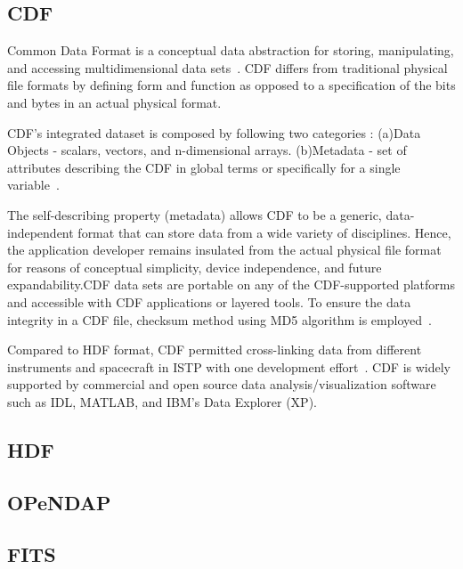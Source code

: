 {\subsection{CDF }

Common Data Format is a conceptual data abstraction for storing,
manipulating, and accessing multidimensional data
sets~\cite{www-cdf}. CDF differs from traditional physical file
formats by defining form and function as opposed to a specification of
the bits and bytes in an actual physical format.
 
CDF's integrated dataset is composed by following two categories :
(a)Data Objects - scalars, vectors, and n-dimensional
arrays. (b)Metadata - set of attributes describing the CDF in global
terms or specifically for a single variable~\cite{user-guide-cdf}.

The self-describing property (metadata) allows CDF to be a generic,
data-independent format that can store data from a wide variety of
disciplines. Hence, the application developer remains insulated from
the actual physical file format for reasons of conceptual simplicity,
device independence, and future expandability.CDF data sets are
portable on any of the CDF-supported platforms and accessible with CDF
applications or layered tools. To ensure the data integrity in a CDF
file, checksum method using MD5 algorithm is
employed~\cite{www-digitalpreserve}.

Compared to HDF format, CDF permitted cross-linking data from
different instruments and spacecraft in ISTP with one development
effort~\cite{www-wiki-hdf}.  CDF is widely supported by commercial and
open source data analysis/visualization software such as IDL, MATLAB,
and IBM’s Data Explorer (XP).

     \pv

\subsection{HDF}

\pv 

\subsection{OPeNDAP}
\pv

\subsection{FITS}

}
